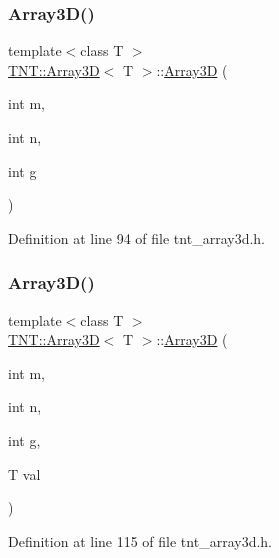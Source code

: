 \mbox{\label{classTNT_1_1Array3D_a3556263018d605d22ce74699f3898559}} 
\subsubsection{\texorpdfstring{Array3\+D()}{Array3D()}\hspace{0.1cm}{\footnotesize\ttfamily [2/5]}}
{\footnotesize\ttfamily template$<$class T $>$ \\
\hyperlink{classTNT_1_1Array3D}{T\+N\+T\+::\+Array3D}$<$ T $>$\+::\hyperlink{classTNT_1_1Array3D}{Array3D} (\begin{DoxyParamCaption}\item[{int}]{m,  }\item[{int}]{n,  }\item[{int}]{g }\end{DoxyParamCaption})}



Definition at line 94 of file tnt\+\_\+array3d.\+h.

\mbox{\label{classTNT_1_1Array3D_a3e5d89a3999c39540a441aeebcd8edc4}} 
\subsubsection{\texorpdfstring{Array3\+D()}{Array3D()}\hspace{0.1cm}{\footnotesize\ttfamily [3/5]}}
{\footnotesize\ttfamily template$<$class T $>$ \\
\hyperlink{classTNT_1_1Array3D}{T\+N\+T\+::\+Array3D}$<$ T $>$\+::\hyperlink{classTNT_1_1Array3D}{Array3D} (\begin{DoxyParamCaption}\item[{int}]{m,  }\item[{int}]{n,  }\item[{int}]{g,  }\item[{T}]{val }\end{DoxyParamCaption})}



Definition at line 115 of file tnt\+\_\+array3d.\+h.

\mbox{\label{classTNT_1_1Array3D_a5830c3a1275b2498bdceb6502e63c28f}} 
